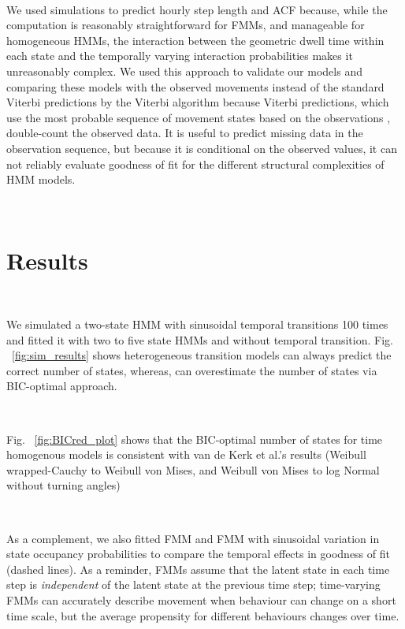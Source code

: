 \documentclass{bmcart}
\begin{document}
\

We used simulations to predict hourly step length and ACF 
because, while the computation is reasonably straightforward for FMMs, and manageable for homogeneous HMMs, the interaction between the geometric dwell time within each state and the temporally varying interaction probabilities makes it unreasonably complex. 
We used this approach to validate our models and comparing these models with the observed movements instead of the standard Viterbi predictions by the Viterbi algorithm because Viterbi predictions, which use the most probable sequence of movement states based on the observations \cite{zucchini_hidden_2009,langrock_flexible_2012}, double-count the observed data. It is useful to predict missing data in the observation sequence, but because it is conditional on the observed values, it can not reliably evaluate goodness of fit for the different structural complexities of HMM models.

\

\section{Results}

\

We simulated a two-state HMM with sinusoidal temporal transitions 100 times and fitted it with two to five state HMMs and without temporal transition.  Fig. ~\ref{fig:sim_results} shows heterogeneous transition models can always predict the correct number of states, whereas, can overestimate the number of states via BIC-optimal approach. 

\

Fig. ~\ref{fig:BICred_plot} shows that the BIC-optimal number of states for time homogenous models is consistent with van de Kerk et al.'s \cite{kerk2015hidden} results (Weibull wrapped-Cauchy to Weibull von Mises, and Weibull von Mises to log Normal without turning angles) 

\

As a complement, we also fitted FMM and FMM with sinusoidal variation in state occupancy probabilities to compare the temporal effects in goodness of fit (dashed lines).
As a reminder, FMMs assume that the latent state in each time step is 
\emph{independent} of the latent state at the previous time step; 
time-varying FMMs can accurately describe movement when behaviour can
change on a short time scale, but the average propensity for different
behaviours changes over time.
\end{document}
